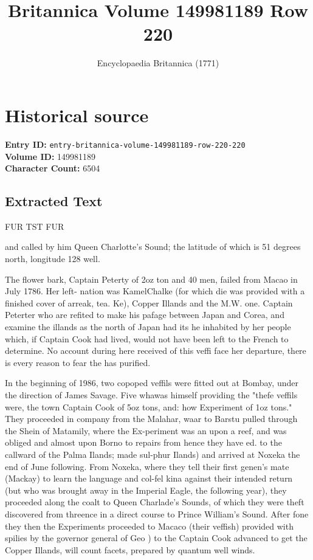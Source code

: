 \documentclass{article}
\title{Britannica Volume 149981189 Row 220}
\date{Encyclopaedia Britannica (1771)}
\begin{document}
\maketitle

\section*{Historical source}
\textbf{Entry ID:} \texttt{entry-britannica-volume-149981189-row-220-220} \\
\textbf{Volume ID:} 149981189 \\
\textbf{Character Count:} 6504

\subsection*{Extracted Text}
FUR TST FUR

and called by him Queen Charlotte’s Sound; the latitude of which is 51 degrees north, longitude 128 well.

The flower bark, Captain Peterty of 2oz ton and 40 men, failed from Macao in July 1786. Her left- nation was KamelChalke (for which die was provided with a finished cover of arreak, tea. Ke), Copper Illands and the M.W. one. Captain Peterter who are refited to make his pafage between Japan and Corea, and examine the illands as the north of Japan had its he inhabited by her people which, if Captain Cook had lived, would not have been left to the French to determine. No account during here received of this veffi face her departure, there is every reason to fear the has purified.

In the beginning of 1986, two copoped veffils were fitted out at Bombay, under the direction of James Savage. Five whawas himself providing the "thefe veffils were, the town Captain Cook of 5oz tons, and: how Experiment of 1oz tons." They proceeded in company from the Malahar, waar to Barstu pulled through the Shein of Matamily, where the Ex-periment was an upon a reef, and was obliged and almost upon Borno to repairs from hence they have ed. to the callward of the Palma Ilands; made sul-phur Ilands) and arrived at Noxeka the end of June following. From Noxeka, where they tell their first genen's mate (Mackay) to learn the language and col-fel kina against their intended return (but who was brought away in the Imperial Eagle, the following year), they proceeded along the coalt to Queen Charlade's Sounds, of which they were theft discovered from threence in a direct course to Prince William's Sound. After fone they then the Experiments proceeded to Macaco (their veffish) provided with spilies by the governor general of Geo ) to the Captain Cook advanced to get the Copper Illands, will count facets, prepared by quantum well winds.
\end{document}
